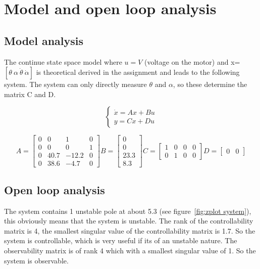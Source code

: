 \section{Model and open loop analysis}
\subsection{Model analysis}
The continue state space model where $u=V$ (voltage on the motor) and x=$[\theta \ \alpha \  \dot{\theta} \ \dot{\alpha} ]$ is theoretical derived in the assignment and leads to the following system. The system can only directly measure $\theta$ and $\alpha$, so these determine the matrix C and D.

$$
\begin{cases}
\dot{x}=Ax+Bu \\
y=Cx+Du
\end{cases}
$$

$$
A=
\begin{bmatrix}
0 & 0 & 1 & 0 \\
0 & 0 & 0 & 1 \\
0 & 40.7 & -12.2 & 0 \\
0 & 38.6 & -4.7 & 0 
\end{bmatrix}
B=
\begin{bmatrix}
0 \\
0 \\
23.3 \\
8.3
\end{bmatrix}
C=
\begin{bmatrix}
1 & 0 & 0 & 0\\
0 & 1 & 0 & 0
\end{bmatrix}
D=
\begin{bmatrix}
0 & 0
\end{bmatrix}
$$

\subsection{Open loop analysis}

The system contains 1 unstable pole at about 5.3 (see figure~\ref{fig:zplot system}), this obviously means that the system is unstable. The rank of the controllability matrix is 4, the smallest singular value of the controllability matrix is 1.7. So the system is controllable, which is very useful if its of an unstable nature. The observability matrix is of rank 4 which with a smallest singular value of 1. So the system is observable.

